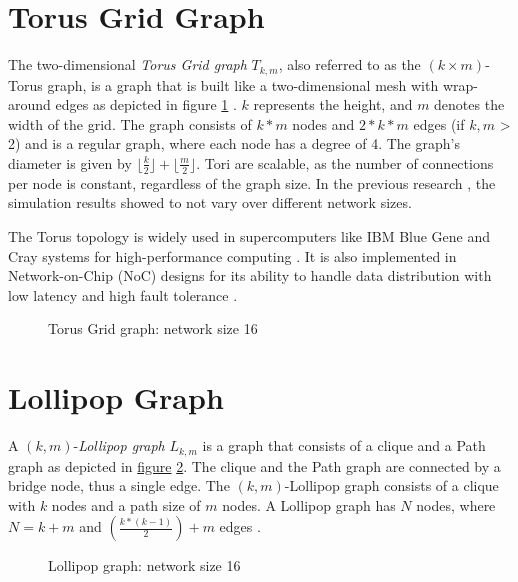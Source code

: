 \section{Torus Grid Graph}\label{sec:2torusgridgraph}
The two-dimensional \textit{Torus Grid graph} $T_{k,m}$, also referred to as the $(k \times m)$-Torus graph, is a graph that is built like a two-dimensional mesh with wrap-around edges as depicted in figure \ref{fig:torusGraph} \cite{Mahlmann2010}. $k$ represents the height, and $m$ denotes the width of the grid. The graph consists of $k * m$ nodes and $2* k * m$ edges (if $k, m$ > 2) and is a regular graph, where each node has a degree of 4. The graph's diameter is given by $\lfloor\frac{k}{2}\rfloor + \lfloor\frac{m}{2}\rfloor$. Tori are scalable, as the number of connections per node is constant, regardless of the graph size. In the previous research \cite{Bayazitoglu}, the simulation results showed to not vary over different network sizes.

The Torus topology is widely used in supercomputers like IBM Blue Gene and Cray systems for high-performance computing \cite{ChengzhongFrancis}. It is also implemented in Network-on-Chip (NoC) designs for its ability to handle data distribution with low latency and high fault tolerance \cite{Banerjee2001}.

\begin{figure}[H]
    \centering
    \scalebox{1.5}{}
    \caption{Torus Grid graph: network size 16}
    \label{fig:torusGraph}
\end{figure}

\section{Lollipop Graph}\label{sec:2lollipopgraph}
A $(k, m)$-\textit{Lollipop graph} $L_{k,m}$ is a graph that consists of a clique and a Path graph as depicted in \hyperref[fig:lollipopgraphDemo]{figure} \ref{fig:lollipopgraphDemo}. The clique and the Path graph are connected by a bridge node, thus a single edge. The $(k, m)$-Lollipop graph consists of a clique with $k$ nodes and a path size of $m$ nodes. A Lollipop graph has $N$ nodes, where $N = k+m$ and $(\frac{k*(k-1)}{2})+m$ edges \cite{JonassonLollipopGraphs2000}.

\begin{figure}[H]
    \centering
    \scalebox{1}{}
    \caption{Lollipop graph: network size 16}
    \label{fig:lollipopgraphDemo}
\end{figure}

